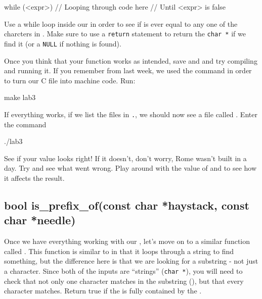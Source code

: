 \documentclass{tufte-handout}
\begin{document}
\begin{Code}
    while (<expr>) {
        // Looping through code here
        // Until <expr> is false
    }
\end{Code}

Use a while loop inside our  in order to see if
 is ever equal to any one of the charcters in
.
Make sure to use a \texttt{return} statement to return the
\verb!char *! if we find it (or a \texttt{NULL} if nothing is found).

Once you think that your function works as intended, save and and try
compiling and running it. If you
remember from last week, we used the  command in
order to turn our C file into machine code. Run:
\begin{CmdLine*}
  \C make lab3\\
\end{CmdLine*}
If everything works, if we list the files in \texttt{.}, we should now see a file called .  Enter the command
\begin{CmdLine*}
  \C ./lab3\\
\end{CmdLine*}
See if your value looks right!  If it doesn't, don't worry, Rome wasn't built in a day. Try and see what went wrong.  Play around with the value of  and  to see how it affects the result.

\subsection{{bool is\_prefix\_of(const char *haystack,
      const char *needle)}}

Once we have everything working with our , let's
move on to a similar function called
. This
function is similar to  in that it loops through
a string to find something, but the difference here is that we are
looking for a substring - not just a character. Since both of the inputs
are ``strings'' (\verb!char *!), you will need to check that not only one character matches in the substring (), but that every character matches. Return true if the  is fully contained by the .
\end{document}
